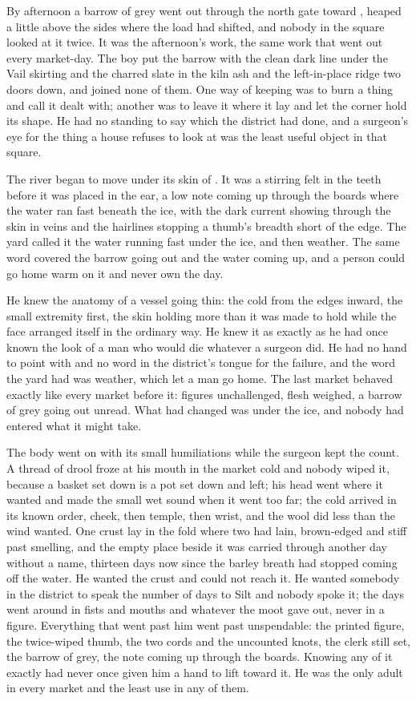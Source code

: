By afternoon a barrow of grey went out through the north gate toward , heaped a little above the sides where the load had shifted, and nobody in the square looked at it twice. It was the afternoon's work, the same work that went out every market-day. The boy put the barrow with the clean dark line under the Vail skirting and the charred slate in the kiln ash and the left-in-place ridge two doors down, and joined none of them. One way of keeping was to burn a thing and call it dealt with; another was to leave it where it lay and let the corner hold its shape. He had no standing to say which the district had done, and a surgeon's eye for the thing a house refuses to look at was the least useful object in that square.

The river began to move under its skin of . It was a stirring felt in the teeth before it was placed in the ear, a low note coming up through the boards where the water ran fast beneath the ice, with the dark current showing through the skin in veins and the hairlines stopping a thumb's breadth short of the edge. The yard called it the water running fast under the ice, and then weather. The same word covered the barrow going out and the water coming up, and a person could go home warm on it and never own the day.

He knew the anatomy of a vessel going thin: the cold from the edges inward, the small extremity first, the skin holding more than it was made to hold while the face arranged itself in the ordinary way. He knew it as exactly as he had once known the look of a man who would die whatever a surgeon did. He had no hand to point with and no word in the district's tongue for the failure, and the word the yard had was weather, which let a man go home. The last market behaved exactly like every market before it: figures unchallenged, flesh weighed, a barrow of grey going out unread. What had changed was under the ice, and nobody had entered what it might take.

The body went on with its small humiliations while the surgeon kept the count. A thread of drool froze at his mouth in the market cold and nobody wiped it, because a basket set down is a pot set down and left; his head went where it wanted and made the small wet sound when it went too far; the cold arrived in its known order, cheek, then temple, then wrist, and the wool did less than the wind wanted. One crust lay in the fold where two had lain, brown-edged and stiff past smelling, and the empty place beside it was carried through another day without a name, thirteen days now since the barley breath had stopped coming off the water. He wanted the crust and could not reach it. He wanted somebody in the district to speak the number of days to Silt and nobody spoke it; the days went around in fists and mouths and whatever the moot gave out, never in a figure. Everything that went past him went past unspendable: the printed figure, the twice-wiped thumb, the two cords and the uncounted knots, the clerk still set, the barrow of grey, the note coming up through the boards. Knowing any of it exactly had never once given him a hand to lift toward it. He was the only adult in every market and the least use in any of them.

